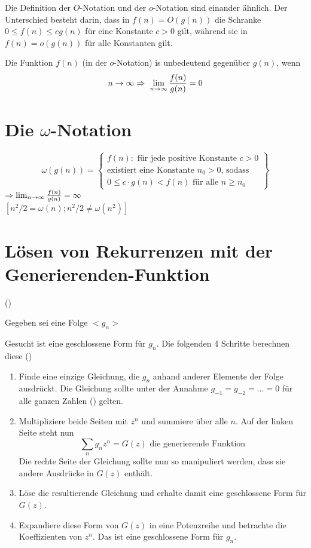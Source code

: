 \documentclass[a4paper,twoside,DIV15,BCOR12mm]{scrbook}
\begin{document}
Die Definition der $O$-Notation und der $o$-Notation sind einander ähnlich. Der Unterschied besteht darin, dass in $f(n)=O(g(n))$ die
Schranke $0 \leq f(n) \leq cg(n)$ für eine Konstante $c>0$ gilt, während sie in $f(n) = o(g(n))$ für alle Konstanten gilt.

Die Funktion $f(n)$ (in der $o$-Notation) is unbedeutend gegenüber $g(n)$, wenn
$$n \rightarrow \infty \Rightarrow\ \lim_{n \rightarrow \infty} \frac{f(n)}{g(n)}=0$$

\section{Die $\omega$-Notation}
$$\omega(g(n)) = \left\{ 
\begin{array}{l}
	f(n) : \text{ für jede positive Konstante }c>0  \\
	\text{existiert eine Konstante $n_0>0$, sodass }\\
	0\leq c \cdot g(n) < f(n) \text{ für alle } n \geq n_0
\end{array} \right\}$$
$\Rightarrow \lim_{n \rightarrow \infty} \frac{f(n)}{g(n)}=\infty$\\
$\left[ n^2/2 = \omega(n); n^2/2 \neq \omega(n^2) \right]$

\section{Lösen von Rekurrenzen mit der Generierenden-Funktion}
()
\begin{description}
	\item{Gegeben} sei eine Folge $<g_n>$
	\item{Gesucht} ist eine geschlossene Form für $g_n$. Die folgenden 4 Schritte berechnen diese ()
\end{description}
\begin{enumerate}
\item Finde eine einzige Gleichung, die $g_n$ anhand anderer Elemente der Folge ausdrückt. Die Gleichung sollte unter der Annahme
      $g_{-1}=g_{-2}= \ldots = 0$ für alle ganzen Zahlen (\MdZ) gelten.
\item Multipliziere beide Seiten mit $z^n$ und summiere über alle $n$. Auf der linken Seite steht nun
      $$\sum_{n}g_nz^n = G(z) \text{ die generierende Funktion}$$
      Die rechte Seite der Gleichung sollte nun so manipuliert werden, dass sie andere Ausdrücke in $G(z)$ enthält.
\item Löse die resultierende Gleichung und erhalte damit eine geschlossene Form für $G(z)$.
\item Expandiere diese Form von $G(z)$ in eine Potenzreihe und betrachte die Koeffizienten von $z^n$. Das ist eine geschlossene
      Form für $g_n$.
\end{enumerate}
\end{document}
